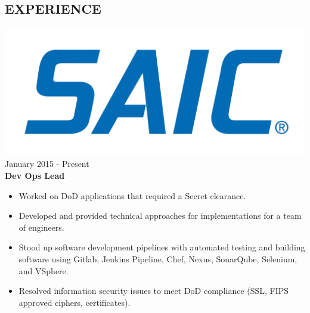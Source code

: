 \documentclass[12pt, line, margin]{res}
\begin{document}
\begin{resume}
\section{ EXPERIENCE} {\sl  \includegraphics[scale=0.015, trim=110 200 110 120]{resume_images/SAIC_logo_RGB-lg.jpg}} \hfill January 2015 - Present \\
                \textbf{Dev Ops Lead} 
                 \begin{itemize}  \itemsep -2pt %
                \item   Worked on DoD applications that required a Secret clearance.
	      \item   Developed and provided technical approaches for \newline
                                implementations for a team of engineers.
	      \item   Stood up software development pipelines with automated testing \newline
                               and building software using Gitlab, Jenkins Pipeline, Chef, Nexus,
                               SonarQube, Selenium, and VSphere.
	      \item   Resolved information security issues to meet DoD compliance\newline
                               (SSL, FIPS approved ciphers, certificates).
                \end{itemize}
                

\end{resume}
\end{document}
